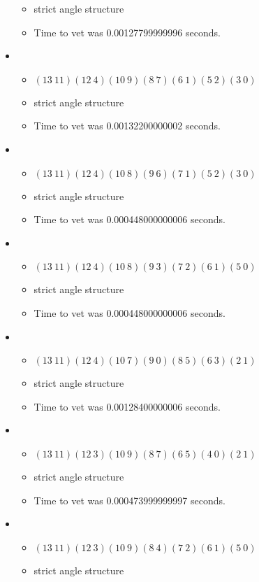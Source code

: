 \documentclass{article}
\begin{document}
\begin{itemize}
\begin{itemize}
      \item strict angle structure
      \item Time to vet was 0.00127799999996 seconds.
\end{itemize}
\item \begin{itemize}
      \item $(13\ 11)(12\ 4)(10\ 9)(8\ 7)(6\ 1)(5\ 2)(3\ 0)$
      \item strict angle structure
      \item Time to vet was 0.00132200000002 seconds.
\end{itemize}
\item \begin{itemize}
      \item $(13\ 11)(12\ 4)(10\ 8)(9\ 6)(7\ 1)(5\ 2)(3\ 0)$
      \item strict angle structure
      \item Time to vet was 0.000448000000006 seconds.
\end{itemize}
\item \begin{itemize}
      \item $(13\ 11)(12\ 4)(10\ 8)(9\ 3)(7\ 2)(6\ 1)(5\ 0)$
      \item strict angle structure
      \item Time to vet was 0.000448000000006 seconds.
\end{itemize}
\item \begin{itemize}
      \item $(13\ 11)(12\ 4)(10\ 7)(9\ 0)(8\ 5)(6\ 3)(2\ 1)$
      \item strict angle structure
      \item Time to vet was 0.00128400000006 seconds.
\end{itemize}
\item \begin{itemize}
      \item $(13\ 11)(12\ 3)(10\ 9)(8\ 7)(6\ 5)(4\ 0)(2\ 1)$
      \item strict angle structure
      \item Time to vet was 0.000473999999997 seconds.
\end{itemize}
\item \begin{itemize}
      \item $(13\ 11)(12\ 3)(10\ 9)(8\ 4)(7\ 2)(6\ 1)(5\ 0)$
      \item strict angle structure

\end{itemize}
\end{itemize}
\end{document}
